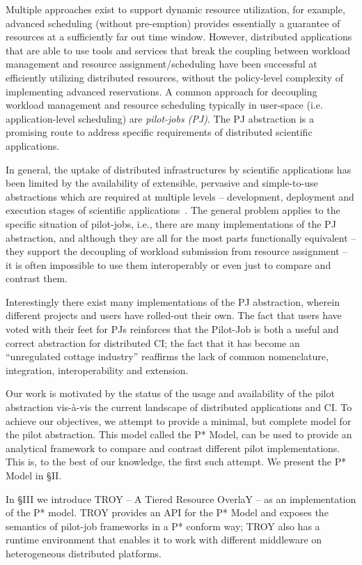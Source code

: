\documentclass[conference,final]{IEEEtran}
\begin{document}
Multiple approaches exist to support dynamic resource utilization, for
example, advanced scheduling (without pre-emption) provides
essentially a guarantee of resources at a sufficiently far out time
window.  However, distributed applications that are able to use tools
and services that break the coupling between workload management and
resource assignment/scheduling have been successful at efficiently
utilizing distributed resources, without the policy-level complexity
of implementing advanced reservations.  A common approach for
decoupling workload management and resource scheduling typically in
user-space (i.e. application-level scheduling) are \emph{pilot-jobs
  (PJ)}.  The PJ abstraction is a promising route to address specific
requirements of distributed scientific applications.

In general, the uptake of distributed infrastructures by scientific
applications has been limited by the availability of extensible,
pervasive and simple-to-use abstractions which are required at
multiple levels – development, deployment and execution stages of
scientific applications~\cite{dpagrid2009}.  The general problem
applies to the specific situation of pilot-jobs, i.e., there are many
implementations of the PJ abstraction, and although they are all for
the most parts functionally equivalent -- they support the decoupling
of workload submission from resource assignment -- it is often
impossible to use them interoperably or even just to compare and
contrast them.

Interestingly there exist many implementations of the PJ abstraction,
wherein different projects and users have rolled-out their own. The
fact that users have voted with their feet for PJs reinforces that the
Pilot-Job is both a useful and correct abstraction for distributed CI;
the fact that it has become an ``unregulated cottage industry''
reaffirms the lack of common nomenclature, integration,
interoperability and extension.

Our work is motivated by the status of the usage and availability of
the pilot abstraction vis-\`{a}-vis the current landscape of
distributed applications and CI. To achieve our objectives, we attempt
to provide a minimal, but complete model for the pilot abstraction.
This model called the P* Model, can be used to provide an analytical
framework to compare and contrast different pilot
implementations. This is, to the best of our knowledge, the first such
attempt. We present the P* Model in \S{II}.

In \S{III} we introduce TROY -- A Tiered Resource OverlaY -- as an
implementation of the P* model. TROY provides an API for the P* Model
and exposes the semantics of pilot-job frameworks in a P* conform
way; TROY also has a runtime environment that enables it to work with
different middleware on heterogeneous distributed platforms.  
\end{document}
